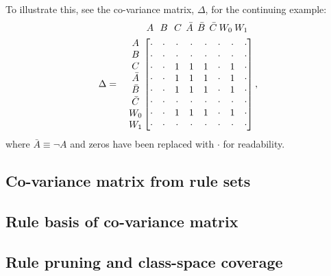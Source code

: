 \documentclass[twoside,11pt]{article}
\begin{document}
To illustrate this, see the co-variance matrix, $\Delta$, for the continuing example:
\begin{align*}
&\;A\:\:\:B\:\:\:C\:\:\bar{A}\:\:\bar{B}\:\:\bar{C}\:W_0\:W_1\\
\Delta = \quad \mqty{A\\B\\C\\\bar{A}\\\bar{B}\\\bar{C}\\W_0\\W_1}\, &\mqty[\cdot&\cdot&\cdot&\cdot&\cdot&\cdot&\cdot&\cdot\\\cdot&\cdot&\cdot&\cdot&\cdot&\cdot&\cdot&\cdot\\\cdot&\cdot&1&1&1&\cdot&1&\cdot\\\cdot&\cdot&1&1&1&\cdot&1&\cdot\\\cdot&\cdot&1&1&1&\cdot&1&\cdot\\\cdot&\cdot&\cdot&\cdot&\cdot&\cdot&\cdot&\cdot\\\cdot&\cdot&1&1&1&\cdot&1&\cdot\\\cdot&\cdot&\cdot&\cdot&\cdot&\cdot&\cdot&\cdot] \, ,
\end{align*}
where $\bar{A} \equiv \neg A$ and zeros have been replaced with $\cdot$ for readability.
\subsection{Co-variance matrix from rule sets}
\subsection{Rule basis of co-variance matrix}
\subsection{Rule pruning and class-space coverage}
\end{document}
